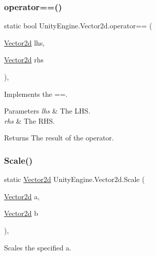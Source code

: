 \subsubsection{\texorpdfstring{operator==()}{operator==()}}
{\footnotesize\ttfamily static bool Unity\+Engine.\+Vector2d.\+operator== (\begin{DoxyParamCaption}\item[{\hyperlink{struct_unity_engine_1_1_vector2d}{Vector2d}}]{lhs,  }\item[{\hyperlink{struct_unity_engine_1_1_vector2d}{Vector2d}}]{rhs }\end{DoxyParamCaption})\hspace{0.3cm}{\ttfamily [inline]}, {\ttfamily [static]}}



Implements the ==. 


\begin{DoxyParams}{Parameters}
{\em lhs} & The L\+HS.\\
\hline
{\em rhs} & The R\+HS.\\
\hline
\end{DoxyParams}
\begin{DoxyReturn}{Returns}
The result of the operator.
\end{DoxyReturn}
\mbox{\label{struct_unity_engine_1_1_vector2d_a2dd7f076846a37be822ef2a34c7c89e3}} 
\subsubsection{\texorpdfstring{Scale()}{Scale()}\hspace{0.1cm}{\footnotesize\ttfamily [1/2]}}
{\footnotesize\ttfamily static \hyperlink{struct_unity_engine_1_1_vector2d}{Vector2d} Unity\+Engine.\+Vector2d.\+Scale (\begin{DoxyParamCaption}\item[{\hyperlink{struct_unity_engine_1_1_vector2d}{Vector2d}}]{a,  }\item[{\hyperlink{struct_unity_engine_1_1_vector2d}{Vector2d}}]{b }\end{DoxyParamCaption})\hspace{0.3cm}{\ttfamily [inline]}, {\ttfamily [static]}}



Scales the specified a. 


